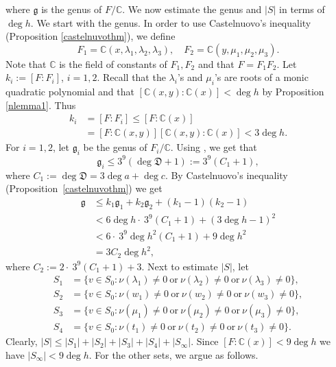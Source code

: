 \documentclass[12pt]{amsart}
\newcommand{\C}{\mbox{$\mathbb C$}}     %
\begin{document}
        where $\mathfrak{g}$ is the genus of $F/\mathbb{C}$. We now estimate the genus and $|S|$ in terms of $\deg h$.
        We start with the genus. In order to use Castelnuovo’s inequality (Proposition \ref{castelnuvothm}), we define
        \[
         F_1 = \mathbb{C}(x, \lambda_1, \lambda_2, \lambda_3), \quad F_2 = \mathbb{C}(y, \mu_1,\mu_2, \mu_3).
        \]
        Note that $\mathbb{C}$ is the field of constants of $F_1, F_2$ and that $F = F_1F_2$. Let $k_i := [F:F_i]$,
        $i=1,2$. Recall that the $\lambda_i$’s and $\mu_i$’s are roots of a monic quadratic polynomial
        and that $[\mathbb{C}(x,y):\mathbb{C}(x)] < \deg h$ by Proposition \ref{nlemma1}. Thus
        \begin{align*}
            k_i&=[F:F_i]\leq [F:\C(x)]\\
            &=[F:\C(x,y)][\C(x,y):\C(x)]<3\deg h.
        \end{align*} For $i=1,2$,
        let $\mathfrak{g}_i$ be the genus of $F_i/\mathbb{C}$. Using \cite[Lemma 6.1]{fuchs2003diophantine}, we get that
        \begin{equation*}
            \mathfrak{g}_i\leq 3^9(\deg \mathfrak{D}+1):=3^9(C_1+1), 
        \end{equation*}
        where $C_1:=\deg \mathfrak{D}=3\deg a+\deg c$. By Castelnuovo’s inequality (Proposition~\ref{castelnuvothm}) we get
        \begin{align*}
            \mathfrak{g} &\leq k_{1} \mathfrak{g}_{1} + k_{2} \mathfrak{g}_{2} + (k_{1}-1)(k_{2}-1)\\
            &<6 \deg h \cdot ~3^9 (C_1+1)+ (3\deg h-1)^2\\
            &< 6\cdot ~3^{9}\deg h^2(C_1+1)+9 \deg h^2\\
            &=3 C_2\deg h^2,
        \end{align*} where $C_2:=2\cdot~3^9(C_1+1)+3$. Next to estimate $|S|$,  let
        \begin{align*}
            S_{1} &= \{ v \in S_{0} : \nu(\lambda_{1}) \neq 0 \ \text{or}\ \nu(\lambda_{2}) \neq 0 \ \text{or}\ \nu(\lambda_{3}) \neq 0 \}, \\
            S_{2} &= \{ v \in S_{0} : \nu(w_{1}) \neq 0 \ \text{or}\ \nu(w_{2}) \neq 0 \ \text{or}\ \nu(w_{3}) \neq 0 \},\\
            S_{3}& = \{ v \in S_{0} : \nu(\mu_{1}) \neq 0 \ \text{or}\ \nu(\mu_{2}) \neq 0 \ \text{or}\ \nu(\mu_{3}) \neq 0 \},\\
            S_{4}& = \{ v \in S_{0} : \nu(t_{1}) \neq 0 \ \text{or}\ \nu(t_{2}) \neq 0 \ \text{or}\ \nu(t_{3}) \neq 0 \}.
        \end{align*}
        Clearly, $|S| \leq |S_{1}| + |S_{2}| + |S_{3}| + |S_{4}| + |S_{\infty}|$. 
Since $[F:\mathbb{C}(x)] < 9 \deg h$ we have $|S_{\infty}| < 9 \deg h$. 
For the other sets, we argue as follows.
\end{document}
